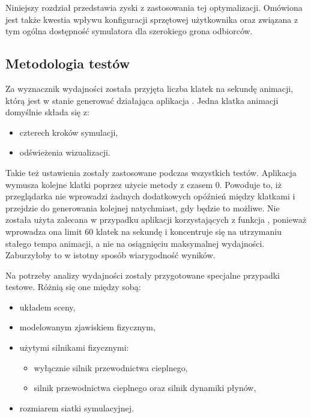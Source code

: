 Niniejszy rozdział przedstawia zyski z zastosowania tej optymalizacji. Omówiona
jest także kwestia wpływu konfiguracji sprzętowej użytkownika oraz związana z
tym ogólna dostępność symulatora dla szerokiego grona odbiorców.

\subsection{Metodologia testów}
\label{sec:metodologiaTestow}

Za wyznacznik wydajności została przyjęta liczba klatek na sekundę animacji,
którą jest w stanie generować działająca aplikacja \en. Jedna klatka animacji
domyślnie składa się z:

\begin{itemize}
\item czterech kroków symulacji, 
\item odświeżenia wizualizacji.
\end{itemize}

Takie też ustawienia zostały zastosowane podczas wszystkich testów.  Aplikacja
wymusza kolejne klatki poprzez użycie metody  z czasem 0.
Powoduje to, iż przeglądarka nie wprowadzi żadnych dodatkowych opóźnień między
klatkami i przejdzie do generowania kolejnej natychmiast, gdy będzie to
możliwe. Nie została użyta zalecana w przypadku aplikacji korzystających z
 funkcja , ponieważ wprowadza ona limit
60 klatek na sekundę i koncentruje się na utrzymaniu stałego tempa animacji, a
nie na osiągnięciu maksymalnej wydajności. Zaburzyłoby to w istotny sposób
wiarygodność wyników.

Na potrzeby analizy wydajności zostały przygotowane specjalne przypadki
testowe. Różnią się one między sobą:

\begin{itemize} 
\item układem sceny, 
\item modelowanym zjawiskiem fizycznym,
\item użytymi silnikami fizycznymi:
	\begin{itemize} 
	\item wyłącznie silnik przewodnictwa cieplnego,
	\item silnik przewodnictwa cieplnego oraz silnik dynamiki płynów,
	\end{itemize}
\item rozmiarem siatki symulacyjnej.
\end{itemize}

